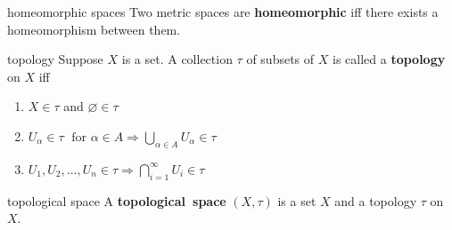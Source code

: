 \documentclass[avery5371,grid]{flashcards}
\begin{document}
\begin{flashcard}[Definition]{homeomorphic spaces}
Two metric spaces are \mbox{\textbf{homeomorphic}} iff there exists a
homeomorphism between them.
\end{flashcard}

\begin{flashcard}[Definition]{topology}
Suppose $X$ is a set.  A collection $\tau$ of subsets of $X$ is called
a \mbox{\textbf{topology}} on $X$ iff
\begin{enumerate}
 \item $X \in \tau$ and $\varnothing \in \tau$
 \item $U_{\alpha} \in \tau \;
 \mbox{ for } \alpha \in A \Rightarrow
 \displaystyle \bigcup_{\alpha \in A} U_{\alpha} \in \tau$
 \item $U_1, U_2, \ldots , U_n \in \tau \Rightarrow
 \displaystyle \bigcap_{i=1}^{\infty} U_i \in \tau$
\end{enumerate}
\end{flashcard}

\begin{flashcard}[Definition]{topological space}
A \mbox{\textbf{topological space}} $(X,\tau)$ is a set $X$ and a 
topology $\tau$ on $X$.
\end{flashcard}

\begin{flashcard}[]{}
\end{flashcard}

\begin{flashcard}[]{}
\end{flashcard}

\begin{flashcard}[]{}
\end{flashcard}

\begin{flashcard}[]{}
\end{flashcard}
\end{document}
